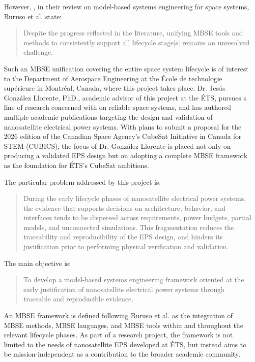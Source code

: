 \documentclass[11pt,a4paper]{article}
\begin{document}
However, \cite{buruso2026modelbased}, in their review on model-based systems engineering for space systems, Buruso et al. state:

\begin{quote}
Despite the progress reflected in the literature, unifying MBSE tools and methods to consistently support all lifecycle stage[s] remains an unresolved challenge.
\end{quote}

Such an MBSE unification covering the entire space system lifecycle is of interest to the Department of Aerospace Engineering at the École de technologie supérieure in Montréal, Canada, where this project takes place.
Dr. Jesús González Llorente, PhD., academic advisor of this project at the ÉTS, pursues a line of research concerned with on reliable space systems, and has authored multiple academic publications targeting the design and validation of nanosatellite electrical power systems.
With plans to submit a proposal for the 2026 edition of the Canadian Space Agency's CubeSat Initiative in Canada for STEM (CUBICS), the focus of Dr. González Llorente is placed not only on producing a validated EPS design but on adopting a complete MBSE framework as the foundation for ÉTS's CubeSat ambitions.

The particular problem addressed by this project is:

\begin{quote}
During the early lifecycle phases of nanosatellite electrical power systems, the evidence that supports decisions on architecture, behavior, and interfaces tends to be dispersed across requirements, power budgets, partial models, and unconnected simulations. This fragmentation reduces the traceability and reproducibility of the EPS design, and hinders its justification prior to performing physical verification and validation.
\end{quote}

The main objective is:

\begin{quote}
To develop a model-based systems engineering framework oriented at the early justification of nanosatellite electrical power systems through traceable and reproducible evidence.
\end{quote}

An MBSE framework is defined following Buruso et al. \cite{buruso2026modelbased} as the integration of MBSE methods, MBSE languages, and MBSE tools within and throughout the relevant lifecycle phases.
As part of a research project, the framework is not limited to the needs of nanosatellite EPS developed at ÉTS, but instead aims to be mission-independent as a contribution to the broader academic community.
\end{document}
